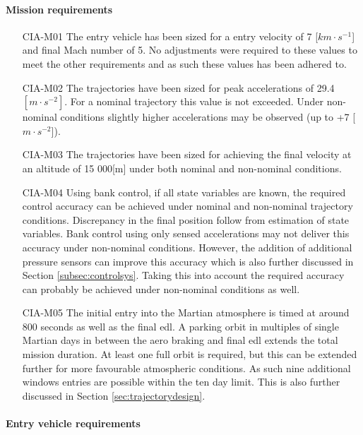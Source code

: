 \paragraph{Mission requirements}
\begin{itemize}[leftmargin=+20mm]
\item[CIA-M01]	The entry vehicle has been sized for a entry velocity of 7 [$km \cdot s^{-1}$] and final Mach number of 5. No adjustments were required to these values to meet the other requirements and as such these values has been adhered to. 
\item[CIA-M02]	The trajectories have been sized for peak accelerations of 29.4 $[m \cdot s^{-2}]$. For a nominal trajectory this value is not exceeded. Under non-nominal conditions slightly higher accelerations may be observed (up to +7 [$m \cdot s ^{-2}$]). 
\item[CIA-M03]  The trajectories have been sized for achieving the final velocity at an altitude of 15 000[m] under both nominal and non-nominal conditions.
\item[CIA-M04]	Using bank control, if all state variables are known, the required control accuracy can be achieved under nominal and non-nominal trajectory conditions. Discrepancy in the final position follow from estimation of state variables. Bank control using only sensed accelerations may not deliver this accuracy under non-nominal conditions. However, the addition of additional pressure sensors can improve this accuracy which is also further discussed in Section \ref{subsec:controlsys}. Taking this into account the required accuracy can probably be achieved under non-nominal conditions as well.
\item[CIA-M05] The initial entry into the Martian atmosphere is timed at around 800 seconds as well as the final \gls{edl}. A parking orbit in multiples of single Martian days in between the aero braking and final \gls{edl} extends the total mission duration. At least one full orbit is required, but this can be extended further for more favourable atmospheric conditions. As such nine additional windows entries are possible within the ten day limit. This is also further discussed  in Section \ref{sec:trajectorydesign}.

\end{itemize}

\paragraph{Entry vehicle requirements}


